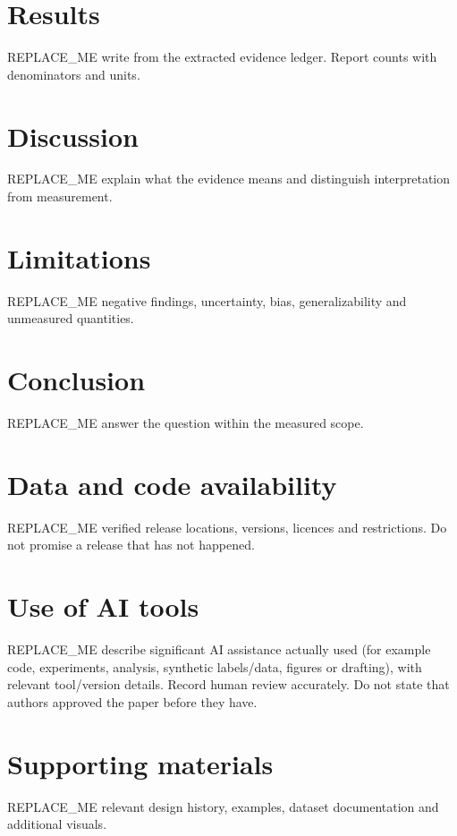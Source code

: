 \documentclass[11pt]{article}
\begin{document}
\section{Results}
REPLACE_ME write from the extracted evidence ledger. Report counts with denominators and units.

\section{Discussion}
REPLACE_ME explain what the evidence means and distinguish interpretation from measurement.

\section{Limitations}
REPLACE_ME negative findings, uncertainty, bias, generalizability and unmeasured quantities.

\section{Conclusion}
REPLACE_ME answer the question within the measured scope.

\section*{Data and code availability}
REPLACE_ME verified release locations, versions, licences and restrictions. Do not promise a release that has not happened.

\section*{Use of AI tools}
REPLACE_ME describe significant AI assistance actually used (for example code, experiments,
analysis, synthetic labels/data, figures or drafting), with relevant tool/version details.
Record human review accurately. Do not state that authors approved the paper before they have.




\appendix
\section{Supporting materials}
REPLACE_ME relevant design history, examples, dataset documentation and additional visuals.
\end{document}
